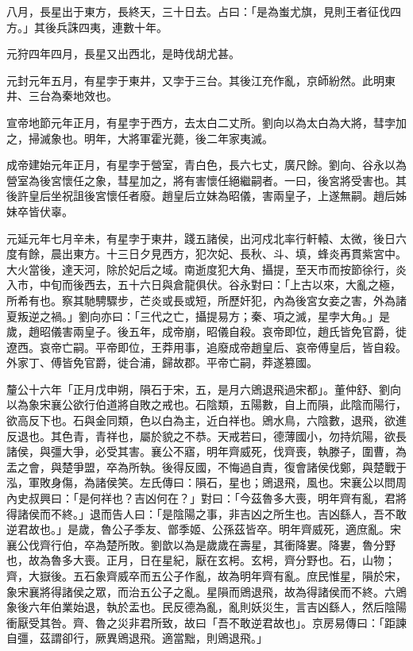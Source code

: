 \begin{pinyinscope}
八月，長星出于東方，長終天，三十日去。占曰：「是為蚩尤旗，見則王者征伐四方。」其後兵誅四夷，連數十年。

元狩四年四月，長星又出西北，是時伐胡尤甚。

元封元年五月，有星孛于東井，又孛于三台。其後江充作亂，京師紛然。此明東井、三台為秦地效也。

宣帝地節元年正月，有星孛于西方，去太白二丈所。劉向以為太白為大將，彗孛加之，掃滅象也。明年，大將軍霍光薨，後二年家夷滅。

成帝建始元年正月，有星孛于營室，青白色，長六七丈，廣尺餘。劉向、谷永以為營室為後宮懷任之象，彗星加之，將有害懷任絕繼嗣者。一曰，後宮將受害也。其後許皇后坐祝詛後宮懷任者廢。趙皇后立妹為昭儀，害兩皇子，上遂無嗣。趙后姊妹卒皆伏辜。

元延元年七月辛未，有星孛于東井，踐五諸侯，出河戍北率行軒轅、太微，後日六度有餘，晨出東方。十三日夕見西方，犯次妃、長秋、斗、填，蜂炎再貫紫宮中。大火當後，達天河，除於妃后之域。南逝度犯大角、攝提，至天市而按節徐行，炎入市，中旬而後西去，五十六日與倉龍俱伏。谷永對曰：「上古以來，大亂之極，所希有也。察其馳騁驟步，芒炎或長或短，所歷奸犯，內為後宮女妾之害，外為諸夏叛逆之禍。」劉向亦曰：「三代之亡，攝提易方；秦、項之滅，星孛大角。」是歲，趙昭儀害兩皇子。後五年，成帝崩，昭儀自殺。哀帝即位，趙氏皆免官爵，徙遼西。哀帝亡嗣。平帝即位，王莽用事，追廢成帝趙皇后、哀帝傅皇后，皆自殺。外家丁、傅皆免官爵，徙合浦，歸故郡。平帝亡嗣，莽遂篡國。

釐公十六年「正月戊申朔，隕石于宋，五，是月六鶂退飛過宋都」。董仲舒、劉向以為象宋襄公欲行伯道將自敗之戒也。石陰類，五陽數，自上而隕，此陰而陽行，欲高反下也。石與金同類，色以白為主，近白祥也。鶂水鳥，六陰數，退飛，欲進反退也。其色青，青祥也，屬於貌之不恭。天戒若曰，德薄國小，勿持炕陽，欲長諸侯，與彊大爭，必受其害。襄公不寤，明年齊威死，伐齊喪，執滕子，圍曹，為盂之會，與楚爭盟，卒為所執。後得反國，不悔過自責，復會諸侯伐鄭，與楚戰于泓，軍敗身傷，為諸侯笑。左氏傳曰：隕石，星也；鶂退飛，風也。宋襄公以問周內史叔興曰：「是何祥也？吉凶何在？」對曰：「今茲魯多大喪，明年齊有亂，君將得諸侯而不終。」退而告人曰：「是陰陽之事，非吉凶之所生也。吉凶繇人，吾不敢逆君故也。」是歲，魯公子季友、鄫季姬、公孫茲皆卒。明年齊威死，適庶亂。宋襄公伐齊行伯，卒為楚所敗。劉歆以為是歲歲在壽星，其衝降婁。降婁，魯分野也，故為魯多大喪。正月，日在星紀，厭在玄枵。玄枵，齊分野也。石，山物；齊，大嶽後。五石象齊威卒而五公子作亂，故為明年齊有亂。庶民惟星，隕於宋，象宋襄將得諸侯之眾，而治五公子之亂。星隕而鶂退飛，故為得諸侯而不終。六鶂象後六年伯業始退，執於盂也。民反德為亂，亂則妖災生，言吉凶繇人，然后陰陽衝厭受其咎。齊、魯之災非君所致，故曰「吾不敢逆君故也」。京房易傳曰：「距諫自彊，茲謂卻行，厥異鶂退飛。適當黜，則鶂退飛。」


\end{pinyinscope}
